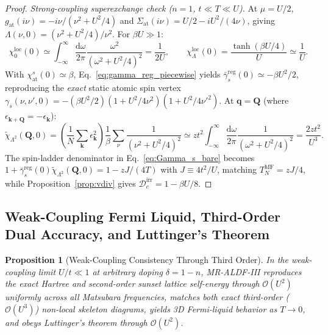\documentclass[11pt,a4paper]{article}
\numberwithin{equation}{section}
\theoremstyle{plain}
\newtheorem{proposition}{Proposition}[section]
\theoremstyle{definition}
\providecommand{\vk}{\mathbf{k}}
\providecommand{\vq}{\mathbf{q}}
\providecommand{\vQ}{\mathbf{Q}}
\providecommand{\dd}{\mathrm{d}}
\begin{document}
\begin{proof}
\emph{Strong-coupling superexchange check ($n=1$, $t \ll T \ll U$).} At $\mu = U/2$,
$g_{\mathrm{at}}(i\nu) = -i\nu/(\nu^2 + U^2/4)$ and
$\Sigma_{\mathrm{at}}(i\nu) = U/2 - iU^2/(4\nu)$, giving
$\Lambda(\nu,0) = (\nu^2 + U^2/4)/\nu^2$. For $\beta U \gg 1$:
\begin{equation}
    \chi_0^{\mathrm{loc}}(0) \simeq \int_{-\infty}^{\infty} \frac{\dd\omega}{2\pi}
        \frac{\omega^2}{(\omega^2 + U^2/4)^2} = \frac{1}{2U},
    \qquad
    \chi_\Lambda^{\mathrm{loc}}(0) = \frac{\tanh(\beta U/4)}{U} \simeq \frac{1}{U}.
\end{equation}
With $\chi_{\mathrm{at}}^s(0) \simeq \beta$, Eq.~\eqref{eq:gamma_reg_piecewise} yields
$\bar{\gamma}_s^{\mathrm{reg}}(0) \simeq -\beta U^2/2$, reproducing the \emph{exact}
static atomic spin vertex
$\gamma_s(\nu,\nu',0) = -(\beta U^2/2)(1 + U^2/4\nu^2)(1 + U^2/4\nu'^2)$. At $\vq = \vQ$
(where $\epsilon_{\vk+\vQ} = -\epsilon_{\vk}$):
\begin{equation}
    \tilde{\chi}_{\Lambda^2}(\vQ,0)
    = \left(\frac{1}{N}\sum_{\vk}\epsilon_{\vk}^2\right)
      \frac{1}{\beta}\sum_{\nu}\frac{1}{(\nu^2 + U^2/4)^2}
    \simeq zt^2 \int_{-\infty}^{\infty} \frac{\dd\omega}{2\pi}
      \frac{1}{(\omega^2 + U^2/4)^2}
    = \frac{2zt^2}{U^3}.
\end{equation}
The spin-ladder denominator in Eq.~\eqref{eq:Gamma_s_bare} becomes
$1 + \bar{\gamma}_s^{\mathrm{reg}}(0)\tilde{\chi}_{\Lambda^2}(\vQ,0) = 1 - zJ/(4T)$
with $J \equiv 4t^2/U$, matching $T_N^{\mathrm{MF}} = zJ/4$, while
Proposition~\ref{prop:vdiv} gives $\mathcal{D}_c^{\mathrm{irr}} = 1 - \beta U/8$.
\end{proof}

\subsection{Weak-Coupling Fermi Liquid, Third-Order Dual Accuracy, and Luttinger's Theorem}
\label{sec:weak_coupling}

\begin{proposition}[Weak-Coupling Consistency Through Third Order]
In the weak-coupling limit $U/t \ll 1$ at arbitrary doping $\delta = 1 - n$, MR-ALDF-III
reproduces the exact Hartree and second-order sunset lattice self-energy through
$\mathcal{O}(U^2)$ uniformly across all Matsubara frequencies, matches both exact
third-order ($\mathcal{O}(U^3)$) non-local skeleton diagrams, yields 3D Fermi-liquid
behavior as $T \to 0$, and obeys Luttinger's theorem through $\mathcal{O}(U^2)$.
\end{proposition}
\end{document}
